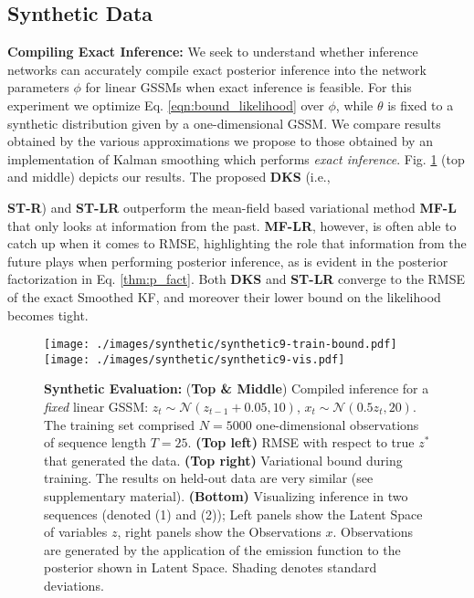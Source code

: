 \documentclass[letterpaper]{article}
\theoremstyle{plain}
\newcommand{\citep}{\cite}
\newcommand{\DKS}{\textbf{DKS}\xspace}
\begin{document}
\subsection{Synthetic Data}
\textbf{Compiling Exact Inference: }
We seek to understand whether inference networks can accurately 
compile exact posterior inference into the network parameters $\phi$
for linear GSSMs when exact inference is feasible.
For this experiment we optimize Eq. \ref{eqn:bound_likelihood} over
$\phi$, while $\theta$ is fixed to a synthetic distribution given by a
one-dimensional GSSM. 
We compare results obtained by the various approximations we propose 
to those obtained by an implementation of Kalman smoothing \citep{kfimplementation} which performs \emph{exact inference}. 
Fig. \ref{fig:synthetic_linear} (top and middle) depicts our results. 
The proposed \textbf{\DKS} (i.e., {\textbf{ST-R}) and \textbf{ST-LR}
outperform the mean-field based variational method \textbf{MF-L} that
only looks at information from the past. \textbf{MF-LR}, however, is
often able to catch up when it comes to RMSE,
highlighting the role that information from the 
future plays when performing posterior 
inference, as is evident in the posterior factorization in Eq. \ref{thm:p_fact}. 
Both \textbf{\DKS} and \textbf{ST-LR} converge to the RMSE of the
exact Smoothed KF, and moreover their lower bound on the likelihood becomes tight.



\begin{figure}[t!]
	\begin{center}
		\texttt{[image: ./images/synthetic/synthetic9-train-bound.pdf]}
		\texttt{[image: ./images/synthetic/synthetic9-vis.pdf]}
	\end{center}
\caption{\label{fig:synthetic_linear}
\small \textbf{Synthetic Evaluation: } ({\bf Top \& Middle}) Compiled inference for a \emph{fixed} linear
  GSSM: $z_t \sim \mathcal{N}(z_{t-1} + 0.05, 10)$, $x_t \sim \mathcal{N}(0.5z_t, 20)$.
The training set comprised $N=5000$ one-dimensional 
observations of sequence length $T=25$.
{\bf (Top left)} RMSE with respect to true $z^*$
  that generated the data. 
{\bf (Top right)} Variational bound during
  training. The results on held-out data are very similar (see supplementary material).
{\bf (Bottom)} Visualizing inference in two sequences (denoted (1) and (2)); Left panels show the Latent Space of variables $z$, right panels show the Observations $x$. Observations are generated by the application of the 
emission function to the posterior shown in Latent Space.
Shading denotes standard deviations.
}
\end{figure}

}
\end{document}
